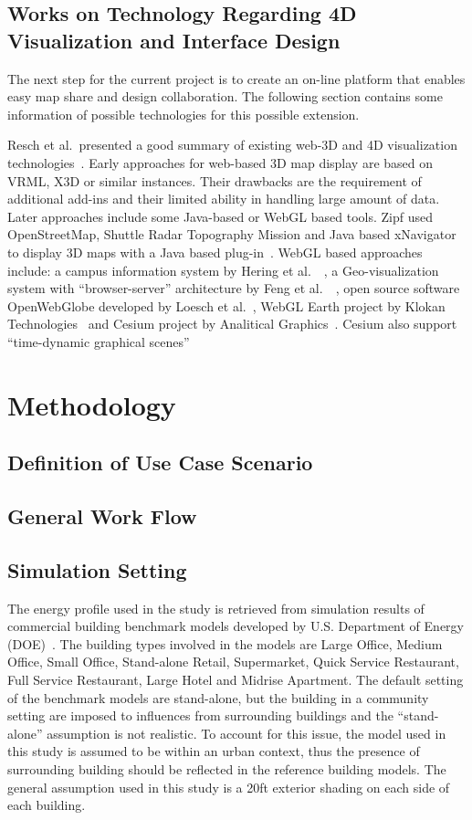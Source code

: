 \documentclass[hidelinks,12pt]{article}
\begin{document}
\subsection{Works on Technology Regarding 4D Visualization and
  Interface Design}
The next step for the current project is to create an on-line platform
that enables easy map share and design collaboration. The following
section contains some information of possible technologies for this
possible extension.

Resch et al.\ presented a good summary of existing web-3D and 4D
visualization technologies~\cite{Resch2014}. Early approaches for
web-based 3D map display are based on VRML, X3D or similar
instances. Their drawbacks are the requirement of additional add-ins
and their limited ability in handling large amount of data. Later
approaches include some Java-based or WebGL based tools. Zipf used
OpenStreetMap, Shuttle Radar Topography Mission and Java based
xNavigator to display 3D maps with a Java based
plug-in~\cite{Zipf2014}. WebGL based approaches include: a campus
information system by Hering et al.\ ~\cite{Hering2011}, a
Geo-visualization system with ``browser-server'' architecture by Feng
et al.\ ~\cite{Feng2011}, open source software OpenWebGlobe developed
by Loesch et al.\ , WebGL Earth project by Klokan
Technologies~\cite{KlokanTechnologies2015} and Cesium project by
Analitical Graphics~\cite{AGI2015}. Cesium also support ``time-dynamic
graphical scenes''~\cite{CZML2015}

\newpage
\section{Methodology}
\subsection{Definition of Use Case Scenario}

\subsection{General Work Flow}
\subsection{Simulation Setting}
 The energy profile used in the study is retrieved from simulation
 results of commercial building benchmark models developed by
 U.S. Department of Energy (DOE)~\cite{DOE2015}. The building types
 involved in the models are Large Office, Medium Office, Small Office,
 Stand-alone Retail, Supermarket, Quick Service Restaurant, Full
 Service Restaurant, Large Hotel and Midrise Apartment. The default
 setting of the benchmark models are stand-alone, but the building in
 a community setting are imposed to influences from surrounding
 buildings and the ``stand-alone'' assumption is not realistic. To
 account for this issue, the model used in this study is assumed to be
 within an urban context, thus the presence of surrounding building
 should be reflected in the reference building models. The general
 assumption used in this study is a 20ft exterior shading on each side
 of each building.
\end{document}
